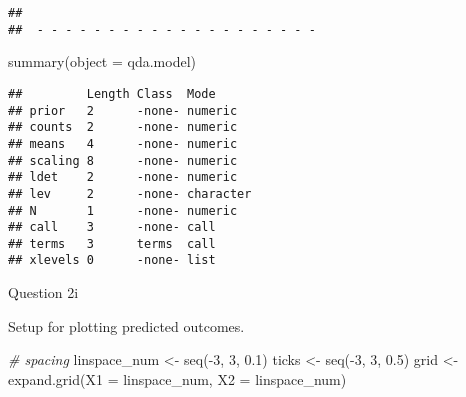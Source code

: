 \documentclass[
]{article}
\newenvironment{Shaded}{\begin{snugshade}}{\end{snugshade}}
\newcommand{\AttributeTok}[1]{\textcolor[rgb]{0.77,0.63,0.00}{#1}}
\newcommand{\CommentTok}[1]{\textcolor[rgb]{0.56,0.35,0.01}{\textit{#1}}}
\newcommand{\DecValTok}[1]{\textcolor[rgb]{0.00,0.00,0.81}{#1}}
\newcommand{\FloatTok}[1]{\textcolor[rgb]{0.00,0.00,0.81}{#1}}
\newcommand{\FunctionTok}[1]{\textcolor[rgb]{0.00,0.00,0.00}{#1}}
\newcommand{\NormalTok}[1]{#1}
\newcommand{\OtherTok}[1]{\textcolor[rgb]{0.56,0.35,0.01}{#1}}
\newcommand{\SpecialCharTok}[1]{\textcolor[rgb]{0.00,0.00,0.00}{#1}}
\begin{document}
\begin{verbatim}
## 
##  - - - - - - - - - - - - - - - - - - - -
\end{verbatim}

\begin{Shaded}
\begin{Highlighting}[]
\FunctionTok{summary}\NormalTok{(}\AttributeTok{object =}\NormalTok{ qda.model)}
\end{Highlighting}
\end{Shaded}

\begin{verbatim}
##         Length Class  Mode     
## prior   2      -none- numeric  
## counts  2      -none- numeric  
## means   4      -none- numeric  
## scaling 8      -none- numeric  
## ldet    2      -none- numeric  
## lev     2      -none- character
## N       1      -none- numeric  
## call    3      -none- call     
## terms   3      terms  call     
## xlevels 0      -none- list
\end{verbatim}

Question 2i

Setup for plotting predicted outcomes.

\begin{Shaded}
\begin{Highlighting}[]
\CommentTok{\# spacing}
\NormalTok{linspace\_num }\OtherTok{\textless{}{-}} \FunctionTok{seq}\NormalTok{(}\SpecialCharTok{{-}}\DecValTok{3}\NormalTok{, }\DecValTok{3}\NormalTok{, }\FloatTok{0.1}\NormalTok{)}
\NormalTok{ticks }\OtherTok{\textless{}{-}} \FunctionTok{seq}\NormalTok{(}\SpecialCharTok{{-}}\DecValTok{3}\NormalTok{, }\DecValTok{3}\NormalTok{, }\FloatTok{0.5}\NormalTok{)}
\NormalTok{grid }\OtherTok{\textless{}{-}} \FunctionTok{expand.grid}\NormalTok{(}\AttributeTok{X1 =}\NormalTok{ linspace\_num, }\AttributeTok{X2 =}\NormalTok{ linspace\_num)}
\end{Highlighting}
\end{Shaded}
\end{document}
